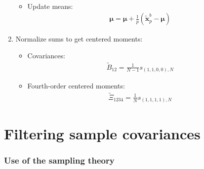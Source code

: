 \documentclass[12pt]{scrartcl}
\begin{document}
\begin{enumerate}
\begin{itemize}
\begin{align}
\end{align}
\item Update means:
\begin{align}
\boldsymbol{\mu} = \boldsymbol{\mu} + \frac{1}{p} \left(\widetilde{\mathbf{x}}^b_p - \boldsymbol{\mu}\right)
\end{align}
\end{itemize}
\item Normalize sums to get centered moments:
\begin{itemize}
\item Covariances:
\begin{align}
\widetilde{B}_{12} = \frac{1}{N-1} s_{(1,1,0,0),N}
\end{align}
\item Fourth-order centered moments:
\begin{align}
\widetilde{\Xi}_{1234} = \frac{1}{N} s_{(1,1,1,1),N}
\end{align} 
\end{itemize}
\end{enumerate}

\clearpage

\part{Filtering sample covariances}

\section{Use of the sampling theory}
\end{document}
